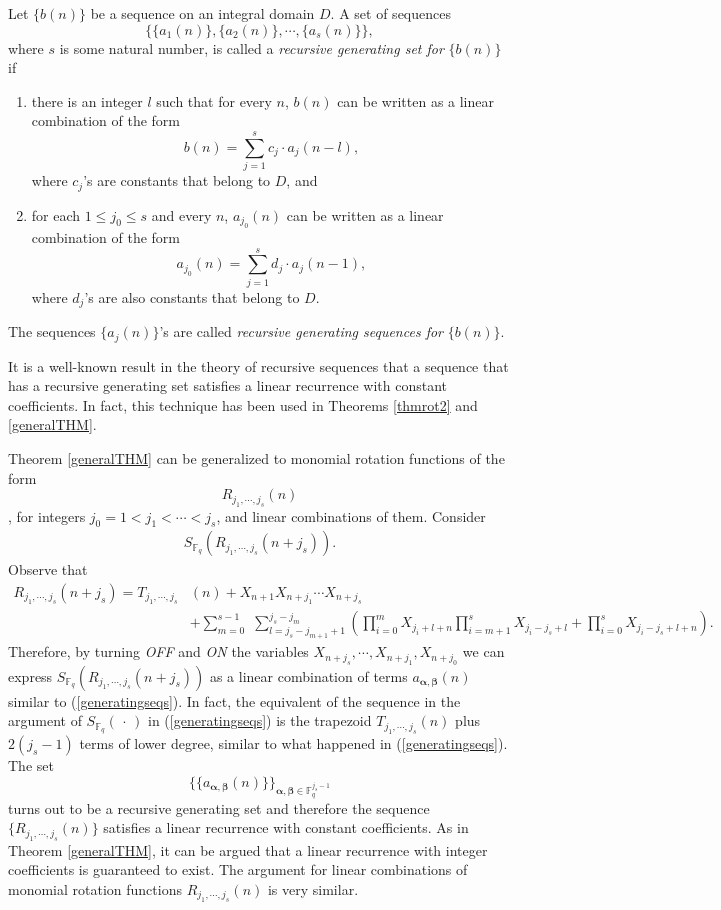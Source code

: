 \begin{definition}
Let $\{b(n)\}$ be a sequence on an integral domain $D$.  A set of sequences $$\{\{a_1(n)\}, \{a_2(n)\},\cdots, \{a_s(n)\}\},$$ where $s$ is some natural number, is called a 
{\em recursive generating set for} $\{b(n)\}$ if 
\begin{enumerate}
 \item there is an integer $l$ such that for every $n$, $b(n)$ can be written as a linear combination of the form 
 $$b(n)=\sum_{j=1}^s c_j\cdot a_j(n-l),$$  
 where $c_j$'s are constants that belong to $D$, and
 \item for each $1\leq j_0 \leq s$ and every $n$, $a_{j_0}(n)$ can be written as a linear combination of the form 
 $$a_{j_0}(n)=\sum_{j=1}^s d_j\cdot a_j(n-1),$$
 where $d_j$'s are also constants that belong to $D$.
\end{enumerate}
The sequences $\{a_j(n)\}$'s are called {\it recursive generating sequences for} $\{b(n)\}$.
\end{definition}


\begin{remark}
It is a well-known result in the theory of recursive sequences that a sequence that has a recursive generating set satisfies a linear recurrence with constant coefficients.  In fact, this technique has been used in Theorems \ref{thmrot2} and \ref{generalTHM}.
\end{remark}

Theorem \ref{generalTHM} can be generalized to monomial rotation functions of the form $$R_{j_1,\cdots, j_s}(n)$$, for integers $j_0=1<j_1<\cdots <j_s$, and linear combinations of them.  Consider
\begin{align*}
 S_{\mathbb{F}_q}(R_{j_1,\cdots,j_s}(n+j_s)).
\end{align*} 
Observe that 
\begin{align*}
R_{j_1,\cdots,j_s}(n+j_s)=T_{j_1,\cdots,j_s}&(n)+X_{n+1}X_{n+j_1}\cdots X_{n+j_s}\\&+\sum _{m=0}^{s-1}\,\, \sum _{l=j_s-j_{m+1}+1}^{j_s-j_m} \left(\prod _{i=0}^m
   X_{j_i+l+n} \prod _{i=m+1}^s X_{j_i-j_s+l}+\prod _{i=0}^s
   X_{j_i-j_s+l+n} \right).
\end{align*}
Therefore, by turning {\it OFF} and {\it ON} the variables $X_{n+j_s},\cdots,X_{n+j_1}, X_{n+j_0}$ we can express $S_{\mathbb{F}_q}(R_{j_1,\cdots,j_s}(n+j_s))$ as a linear combination of terms $a_{\boldsymbol{\alpha},\boldsymbol{\beta}}(n)$ similar to (\ref{generatingseqs}).  In fact, the equivalent of the sequence in the argument of $S_{\mathbb{F}_q}(\,\cdot\,)$ in (\ref{generatingseqs}) is the trapezoid $T_{j_1,\cdots,j_s}(n)$
plus $2(j_s-1)$ terms of lower degree, similar to what happened in (\ref{generatingseqs}).  The set 
$$\{\{a_{\boldsymbol{\alpha},\boldsymbol{\beta}}(n)\}\}_{\boldsymbol{\alpha},\boldsymbol{\beta}\in \mathbb{F}_{q}^{j_s-1}}$$ turns out to be a recursive generating set and therefore
the sequence $\{R_{j_1,\cdots, j_s}(n)\}$ satisfies a linear recurrence with constant coefficients.  As in Theorem \ref{generalTHM}, it can be argued that a linear recurrence with 
integer coefficients is guaranteed to exist.  The argument for linear combinations of monomial rotation functions $R_{j_1,\cdots, j_s}(n)$ is very similar.


